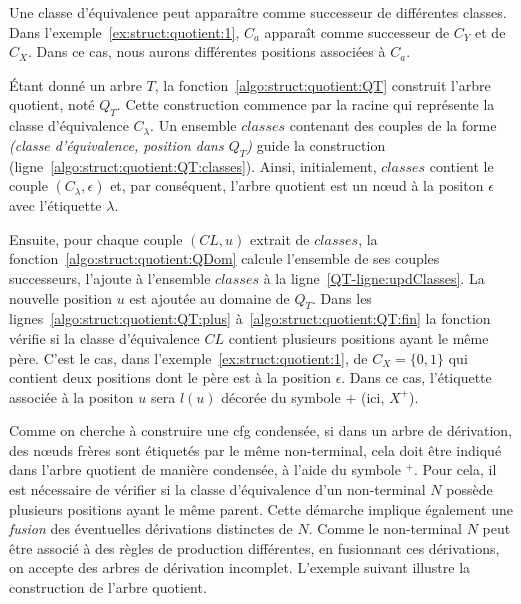 \begin{remark}
    Une classe d'équivalence peut apparaître comme successeur de différentes classes.
    Dans l'exemple~\ref{ex:struct:quotient:1}, $C_a$ apparaît comme successeur de $C_Y$ et de $C_X$.
    Dans ce cas, nous aurons différentes positions associées à $C_a$.
\end{remark}

Étant donné un arbre $T$, la fonction~\ref{algo:struct:quotient:QT} construit l'arbre quotient, noté $Q_T$.
Cette construction commence par la racine qui représente la classe d'équivalence $C_{\lambda}$.
Un ensemble $classes$ contenant des couples de la forme \textit{(classe d'équivalence, position dans $Q_T$)} guide la construction (ligne~\ref{algo:struct:quotient:QT:classes}).
Ainsi, initialement, $classes$ contient le couple $(C_{\lambda}, \epsilon)$ et, par conséquent, l'arbre quotient est un nœud à la positon $\epsilon$ avec l'étiquette $\lambda$.

Ensuite, pour chaque couple $(CL, u)$ extrait de $classes$, la fonction~\ref{algo:struct:quotient:QDom} calcule l'ensemble de ses couples successeurs, l'ajoute à l'ensemble $classes$ à la ligne~\ref{QT-ligne:updClasses}.
La nouvelle position $u$ est ajoutée au domaine de $Q_T$.
Dans les lignes~\ref{algo:struct:quotient:QT:plus} à~\ref{algo:struct:quotient:QT:fin} la fonction vérifie si la classe d'équivalence $CL$ contient plusieurs positions ayant le même père.
C'est le cas, dans l'exemple~\ref{ex:struct:quotient:1}, de $C_X=\{0, 1\}$ qui contient deux positions dont le père est à la position $\epsilon$.
Dans ce cas, l'étiquette associée à la positon $u$ sera $l(u)$ décorée du symbole $+$ (ici, $X^+$).

Comme on cherche à construire une \gls{cfg} condensée, si dans un arbre de dérivation, des nœuds frères sont étiquetés par le même non-terminal, cela doit être indiqué dans l'arbre quotient de manière condensée, à l'aide du symbole ${}^+$.
Pour cela, il est nécessaire de vérifier si la classe d'équivalence d'un non-terminal $N$ possède plusieurs positions ayant le même parent.
Cette démarche implique également une \textit{fusion} des éventuelles dérivations distinctes de $N$.
Comme le non-terminal $N$ peut être associé à des règles de production différentes, en fusionnant ces dérivations, on accepte des arbres de dérivation incomplet.
L'exemple suivant illustre la construction de l'arbre quotient.

